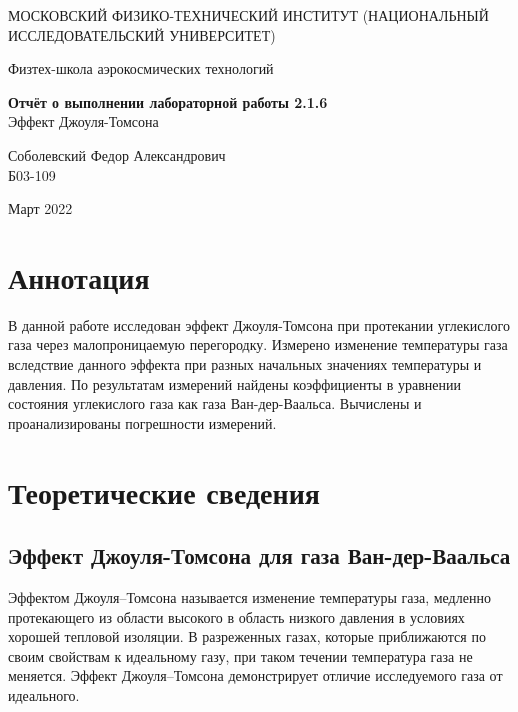 \documentclass[a4paper,12pt]{article} %
\date{\today}
\begin{document}
\begin{titlepage}
	\begin{center}
		{\large МОСКОВСКИЙ ФИЗИКО-ТЕХНИЧЕСКИЙ ИНСТИТУТ (НАЦИОНАЛЬНЫЙ ИССЛЕДОВАТЕЛЬСКИЙ УНИВЕРСИТЕТ)}
	\end{center}
	\begin{center}
		{\large Физтех-школа аэрокосмических технологий}
	\end{center}
	
	
	\vspace{4.5cm}
	{\huge
		\begin{center}
			{\bf Отчёт о выполнении лабораторной работы 2.1.6}\\
			Эффект Джоуля-Томсона
		\end{center}
	}
	\vspace{1cm}
	\begin{center}
		{\large Соболевский Федор Александрович \\
			\vspace{0.2cm}
			Б03-109}
	\end{center}
	\vspace{8cm}
	\begin{center}
		Март 2022
	\end{center}
\end{titlepage}

\section{Аннотация}

В данной работе исследован эффект Джоуля-Томсона при протекании углекислого газа через малопроницаемую перегородку. Измерено изменение температуры газа вследствие данного эффекта при разных начальных значениях температуры и давления. По результатам измерений найдены коэффициенты в уравнении состояния углекислого газа как газа Ван-дер-Ваальса. Вычислены и проанализированы погрешности измерений.

\section{Теоретические сведения}

\subsection{Эффект Джоуля-Томсона для газа Ван-дер-Ваальса}

Эффектом Джоуля–Томсона называется изменение температуры газа, медленно протекающего из области высокого в область низкого давления в условиях хорошей тепловой изоляции.
В разреженных газах, которые приближаются по своим свойствам к идеальному газу, при таком течении температура газа не меняется. Эффект Джоуля–Томсона демонстрирует отличие исследуемого газа от идеального.
\end{document}
